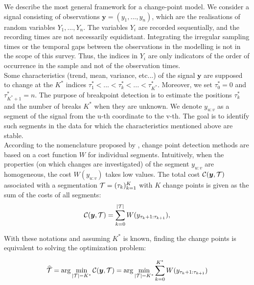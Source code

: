 We describe the most general framework for a change-point model. We consider a signal consisting of observations $\bm y = (y_1,...,y_n)$, which are the realisations of random variables $Y_1,...,Y_n$. The variables $Y_i$ are recorded sequentially, and the recording times are not necessarily equidistant. Integrating the irregular sampling times or the temporal gaps between the observations in the modelling is not in the scope of this survey. Thus, the indices in $Y_i$ are only indicators of the order of occurrence in the sample and not of the observation times. \\
Some characteristics (trend, mean, variance, etc...) of the signal $\bm y$ are supposed to change at the $K^*$ indices $\tau^*_1 <... < \tau^*_k <... < \tau^*_{K^*}$. Moreover, we set $\tau^*_0 = 0$ and $\tau^*_{K^*+1} = n$. The purpose of breakpoint detection is to estimate the positions $\tau^*_k$ and the number of breaks $K^*$ when they are unknown. We denote $y_{u:v}$ as a segment of the signal from the u-th coordinate to the v-th. The goal is to identify such segments in the data for which the characteristics mentioned above are stable. \\
According to the nomenclature proposed by \cite{truong2020}, change point detection methods are based on a cost function $W$ for individual segments. Intuitively, when the properties (on which changes are investigated) of the segment $y_{u:v}$ are homogeneous, the cost $W(y_{u:v})$ takes low values. The total cost ${\mathcal C}(\bm y,{\mathcal T})$ associated with a segmentation ${\mathcal T} = (\tau_{k})_{k=1}^K$ with $K$ change points is given as the sum of the costs of all segments:
\begin{equation}\label{chp:3:costfunc}
{\mathcal C}(\bm y,{\mathcal T}) = \sum_{k=0}^{\lvert {\mathcal T} \rvert} W(y_{\tau_k+1:\tau_{k+1}}), 
\end{equation}     

With these notations and assuming $K^*$ is known, finding the change points is equivalent to solving the optimization problem:

\begin{equation}\label{chp:3:optKknown}
 \widehat{{\mathcal T}}  = \arg \min_{\lvert {\mathcal T} \rvert = K^*}  {\mathcal C}(\bm y, {\mathcal T}) = \arg \min_{\lvert {\mathcal T} \rvert = K^*} \sum_{k=0}^{K^*} W(y_{\tau_k+1:\tau_{k+1}})   
\end{equation}

